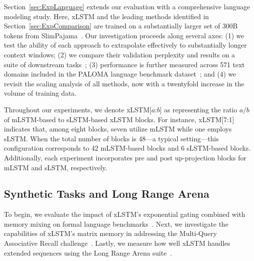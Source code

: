 Section~\ref{sec:ExpLanguage} extends our evaluation with a comprehensive language modeling study. Here, xLSTM and the leading methods identified in Section~\ref{sec:ExpComparison} are trained on a substantially larger set of 300B tokens from SlimPajama~\citep{Soboleva:23}. Our investigation proceeds along several axes: (1) we test the ability of each approach to extrapolate effectively to substantially longer context windows; (2) we compare their validation perplexity and results on a suite of downstream tasks~\citep{Sutawika:24}; (3) performance is further measured across 571 text domains included in the PALOMA language benchmark dataset~\citep{Magnusson:23arxivshort}; and (4) we revisit the scaling analysis of all methods, now with a twentyfold increase in the volume of training data.

Throughout our experiments, we denote xLSTM[$a$:$b$] as representing the ratio $a/b$ of mLSTM-based to sLSTM-based xLSTM blocks. For instance, xLSTM[7:1] indicates that, among eight blocks, seven utilize mLSTM while one employs sLSTM. When the total number of blocks is 48—a typical setting—this configuration corresponds to 42 mLSTM-based blocks and 6 sLSTM-based blocks. Additionally, each experiment incorporates pre and post up-projection blocks for mLSTM and sLSTM, respectively.

\subsection{Synthetic Tasks and Long Range Arena}
\label{sec:ExpSyntethic}
To begin, we evaluate the impact of xLSTM’s exponential gating combined with memory mixing on formal language benchmarks~\citep{Deletang:23}. Next, we investigate the capabilities of xLSTM's matrix memory in addressing the Multi-Query Associative Recall challenge~\citep{Arora:23arxiv}. Lastly, we measure how well xLSTM handles extended sequences using the Long Range Arena suite~\citep{Tay:21}.

